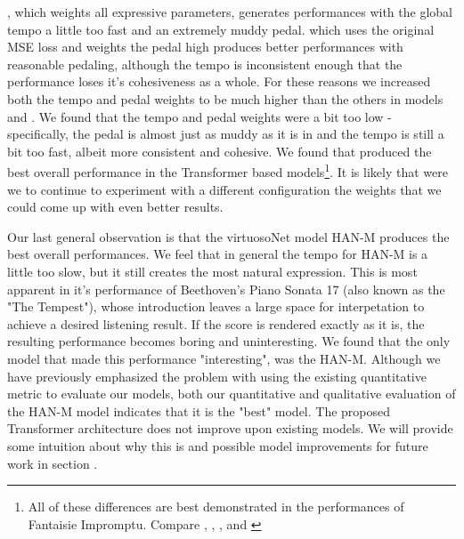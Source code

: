 , which weights all expressive parameters, generates performances with the global tempo a little too fast and an extremely muddy pedal.  which uses the original MSE loss and weights the pedal high produces better performances with reasonable pedaling, although the tempo is inconsistent enough that the performance loses it's cohesiveness as a whole. For these reasons we increased both the tempo and pedal weights to be much higher than the others in models  and . We found that the tempo and pedal weights  were a bit too low - specifically, the pedal is almost just as muddy as it is in  and the tempo is still a bit too fast, albeit more consistent and cohesive. We found that  produced the best overall performance in the Transformer based models\footnote{All of these differences are best demonstrated in the performances of Fantaisie Impromptu. Compare \href{https://ui.neptune.ai/richt3211/thesis/e/THESIS-154/artifacts}{}, \href{https://ui.neptune.ai/richt3211/thesis/e/THESIS-150/artifacts}{}, \href{https://ui.neptune.ai/richt3211/thesis/e/THESIS-156/artifacts}{}, and \href{https://ui.neptune.ai/richt3211/thesis/e/THESIS-157/artifacts}{} }. It is likely that were we to continue to experiment with a different configuration the weights that we could come up with even better results. 

Our last general observation is that the virtuosoNet model HAN-M produces the best overall performances. We feel that in general the tempo for HAN-M is a little too slow, but it still creates the most natural expression. This is most apparent in it's performance of Beethoven's Piano Sonata 17 (also known as the "The Tempest"), whose introduction leaves a large space for interpetation to achieve a desired listening result. If the score is rendered exactly as it is, the resulting performance becomes boring and uninteresting. We found that the only model that made this performance "interesting", was the HAN-M. Although we have previously emphasized the problem with using the existing quantitative metric to evaluate our models, both our quantitative and qualitative evaluation of the HAN-M model indicates that it is the "best" model. The proposed Transformer architecture does not improve upon existing models. We will provide some intuition about why this is and possible model improvements for future work in section . 





